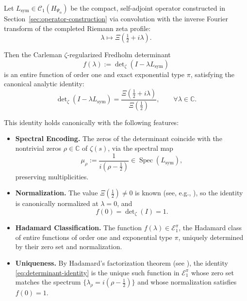 \begin{theorem}
\label{thm:det_identity_revised}
\leavevmode
\begin{tcolorbox}[colback=gray!3!white,colframe=black!75!white,title={\textbf{Canonical Determinant Identity}}]
Let \( L_{\mathrm{sym}} \in \mathcal{C}_1(H_{\Psi_\alpha}) \) be the compact, self-adjoint operator constructed in Section~\ref{sec:operator-construction} via convolution with the inverse Fourier transform of the completed Riemann zeta profile:
\[
\lambda \mapsto \Xi\left(\tfrac{1}{2} + i\lambda\right).
\]

\medskip

Then the Carleman \(\zeta\)-regularized Fredholm determinant
\[
f(\lambda) := \det\nolimits_\zeta(I - \lambda L_{\mathrm{sym}})
\]
is an entire function of order one and exact exponential type \( \pi \), satisfying the canonical analytic identity:
\begin{equation}
\det\nolimits_\zeta(I - \lambda L_{\mathrm{sym}})
= \frac{\Xi\left(\tfrac{1}{2} + i\lambda\right)}{\Xi\left(\tfrac{1}{2}\right)},
\qquad \forall \lambda \in \mathbb{C}.
\label{eq:determinant_identity}
\end{equation}

\medskip

This identity holds canonically with the following features:
\begin{itemize}
  \item \textbf{Spectral Encoding.} The zeros of the determinant coincide with the nontrivial zeros \( \rho \in \mathbb{C} \) of \( \zeta(s) \), via the spectral map
  \[
  \mu_\rho := \frac{1}{i(\rho - \tfrac{1}{2})} \in \operatorname{Spec}(L_{\mathrm{sym}}),
  \]
  preserving multiplicities.

  \item \textbf{Normalization.} The value \( \Xi(\tfrac{1}{2}) \ne 0 \) is known (see, e.g., \cite[Thm.~2.3]{Titchmarsh1986Zeta}), so the identity is canonically normalized at \( \lambda = 0 \), and
  \[
  f(0) = \det\nolimits_\zeta(I) = 1.
  \]

  \item \textbf{Hadamard Classification.} The function \( f(\lambda) \in \mathcal{E}_1^\pi \), the Hadamard class of entire functions of order one and exponential type \( \pi \), uniquely determined by their zero set and normalization.

  \item \textbf{Uniqueness.} By Hadamard’s factorization theorem (see \cite[Ch.~3]{Levin1996EntireLectures}), the identity \eqref{eq:determinant-identity} is the unique such function in \( \mathcal{E}_1^\pi \) whose zero set matches the spectrum \( \{ \lambda_\rho = i(\rho - \tfrac{1}{2}) \} \) and whose normalization satisfies \( f(0) = 1 \).
\end{itemize}
\end{tcolorbox}
\end{theorem}
